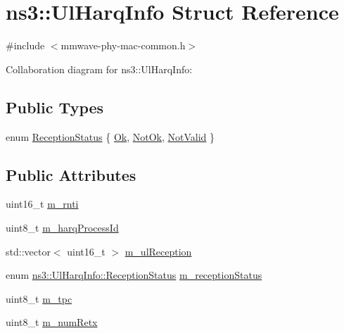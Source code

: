 \hypertarget{structns3_1_1UlHarqInfo}{}\section{ns3\+:\+:Ul\+Harq\+Info Struct Reference}
\label{structns3_1_1UlHarqInfo}


{\ttfamily \#include $<$mmwave-\/phy-\/mac-\/common.\+h$>$}



Collaboration diagram for ns3\+:\+:Ul\+Harq\+Info\+:
\subsection*{Public Types}
\begin{DoxyCompactItemize}
\item 
enum \hyperlink{structns3_1_1UlHarqInfo_af1ea9a1ce02c9b4a551ac978484a4336}{Reception\+Status} \{ \hyperlink{structns3_1_1UlHarqInfo_af1ea9a1ce02c9b4a551ac978484a4336ad61a738c75abe251c05daa2461ecf308}{Ok}, 
\hyperlink{structns3_1_1UlHarqInfo_af1ea9a1ce02c9b4a551ac978484a4336a488db5f30de0c73647fed90c4a994a83}{Not\+Ok}, 
\hyperlink{structns3_1_1UlHarqInfo_af1ea9a1ce02c9b4a551ac978484a4336acf7ce7fcd9c7c1fc6707687650bf4146}{Not\+Valid}
 \}
\end{DoxyCompactItemize}
\subsection*{Public Attributes}
\begin{DoxyCompactItemize}
\item 
uint16\+\_\+t \hyperlink{structns3_1_1UlHarqInfo_a8bcadb9c7156f60b4901f1bd6610a3d6}{m\+\_\+rnti}
\item 
uint8\+\_\+t \hyperlink{structns3_1_1UlHarqInfo_aa760d5b58c00e6cdb5af993e3251f1cc}{m\+\_\+harq\+Process\+Id}
\item 
std\+::vector$<$ uint16\+\_\+t $>$ \hyperlink{structns3_1_1UlHarqInfo_af288dc402b2d70c2a78b41b9aa6a0ffc}{m\+\_\+ul\+Reception}
\item 
enum \hyperlink{structns3_1_1UlHarqInfo_af1ea9a1ce02c9b4a551ac978484a4336}{ns3\+::\+Ul\+Harq\+Info\+::\+Reception\+Status} \hyperlink{structns3_1_1UlHarqInfo_abfb291f34f87a5ddb283e99d85042330}{m\+\_\+reception\+Status}
\item 
uint8\+\_\+t \hyperlink{structns3_1_1UlHarqInfo_a59952a2ca0b92f8e4bcf80a0fd32b82d}{m\+\_\+tpc}
\item 
uint8\+\_\+t \hyperlink{structns3_1_1UlHarqInfo_ac81e7c365fee54494222d75b5d327b89}{m\+\_\+num\+Retx}
\end{DoxyCompactItemize}


